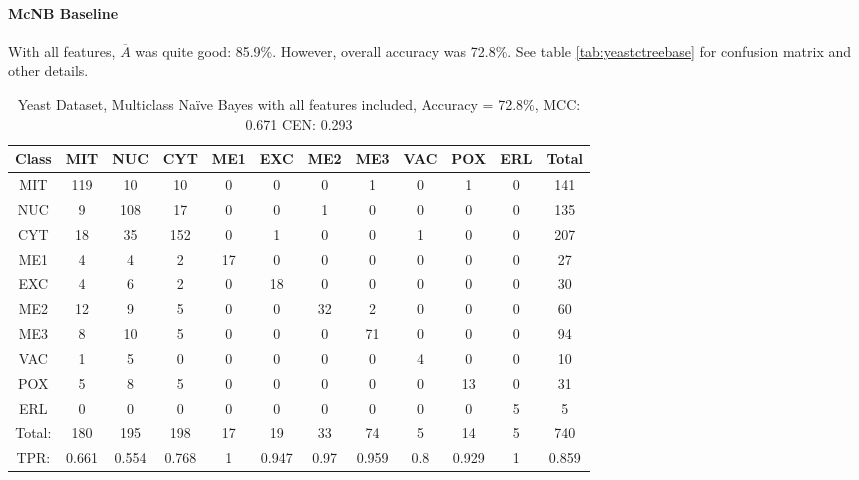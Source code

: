 \paragraph{McNB Baseline}
With all features, $\overline{A}$ was quite good: 85.9\%.  However, overall accuracy was 72.8\%.  See table \ref{tab:yeastctreebase} for confusion matrix and other details.
\\
\begin{table}[h!]
\begin{tabular}{|c|c|c|c|c|c|c|c|c|c|c|c|}
	\hline
Class&MIT&NUC&CYT&ME1&EXC&ME2&ME3&VAC&POX&ERL&Total\\\hline
MIT&119&10&10&0&0&0&1&0&1&0&141\\
NUC&9&108&17&0&0&1&0&0&0&0&135\\
CYT&18&35&152&0&1&0&0&1&0&0&207\\
ME1&4&4&2&17&0&0&0&0&0&0&27\\
EXC&4&6&2&0&18&0&0&0&0&0&30\\
ME2&12&9&5&0&0&32&2&0&0&0&60\\
ME3&8&10&5&0&0&0&71&0&0&0&94\\
VAC&1&5&0&0&0&0&0&4&0&0&10\\
POX&5&8&5&0&0&0&0&0&13&0&31\\
ERL&0&0&0&0&0&0&0&0&0&5&5\\
\hline
Total:&180&195&198&17&19&33&74&5&14&5&740\\
TPR:&0.661&0.554&0.768&1&0.947&0.97&0.959&0.8&0.929&1&0.859\\
\hline
\end{tabular}
\caption[Yeast: Multiclass Na\"ive Bayes without Feature Selection Confusion Matrix]{Yeast Dataset, Multiclass Na\"ive Bayes with all features included, Accuracy = 72.8\%, MCC: 0.671 CEN: 0.293}
\label{tab:yeastmcnbbase}
\end{table}

